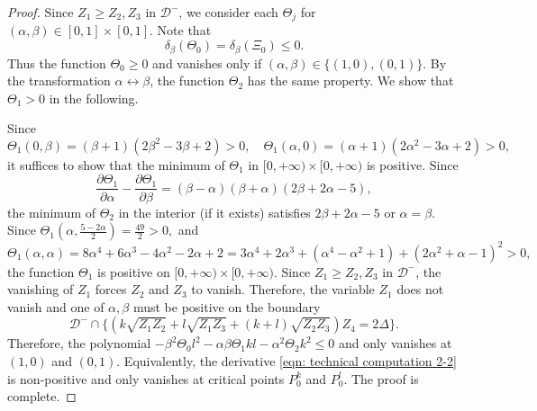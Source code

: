 \documentclass[11pt,letterpaper]{amsart}
\theoremstyle{definition}
\numberwithin{equation}{section}
\begin{document}
\begin{proof}
Since $Z_1\geq Z_2,Z_3$ in $\mathcal{D}^-$, we consider each $\Theta_j$ for $(\alpha,\beta)\in [0,1]\times [0,1]$. Note that
$$\delta_\beta (\Theta_0)=\delta_\beta (\Xi_0)\leq 0.$$ 
Thus the function $\Theta_0\geq 0$ and vanishes only if $(\alpha,\beta)\in \{(1,0),(0,1)\}$. By the transformation $\alpha\leftrightarrow \beta$, the function $\Theta_2$ has the same property. We show that $\Theta_1> 0$ in the following. 

Since
$$
\Theta_1(0,\beta)=(\beta+1)(2\beta^2-3\beta+2)>0,\quad \Theta_1(\alpha,0)=(\alpha+1)(2\alpha^2-3\alpha+2)>0,
$$
it suffices to show that the minimum of $\Theta_1$ in $[0,+\infty)\times [0,+\infty)$ is positive. Since 
$$
\frac{\partial \Theta_1}{\partial \alpha}-\frac{\partial \Theta_1}{\partial \beta}=(\beta-\alpha)(\beta+\alpha)(2\beta+2\alpha-5),
$$
the minimum of $\Theta_2$ in the interior (if it exists) satisfies $2\beta+2\alpha-5$ or $\alpha=\beta$.
Since 
$
\Theta_1\left(\alpha,\frac{5-2\alpha}{2}\right)=\frac{49}{2}>0,
$ and 
$$
\Theta_1(\alpha,\alpha)=8\alpha^4 + 6\alpha^3 - 4\alpha^2 - 2\alpha + 2=3\alpha^4+2\alpha^3+(\alpha^4-\alpha^2+1)+(2\alpha^2+\alpha-1)^2>0,
$$
the function $\Theta_1$ is positive on $[0,+\infty)\times [0,+\infty)$. Since $Z_1\geq Z_2,Z_3$ in $\mathcal{D}^-$, the vanishing of $Z_1$ forces $Z_2$ and $Z_3$ to vanish. Therefore, the variable $Z_1$ does not vanish and one of $\alpha,\beta$ must be positive on the boundary 
$$\mathcal{D}^-\cap \{\left(k\sqrt{Z_1Z_2}+l\sqrt{Z_1Z_3}+(k+l)\sqrt{Z_2Z_3}\right)Z_4=2\Delta\}.$$
Therefore, the polynomial $-\beta^2\Theta_0 l^2-\alpha\beta\Theta_1kl-\alpha^2\Theta_2k^2\leq 0$ and only vanishes at $(1,0)$ and $(0,1)$. Equivalently, the derivative \eqref{eqn: technical computation 2-2} is non-positive and only vanishes at critical points $P_0^{k}$ and $P_0^{l}$. The proof is complete.
\end{proof}
\end{document}
